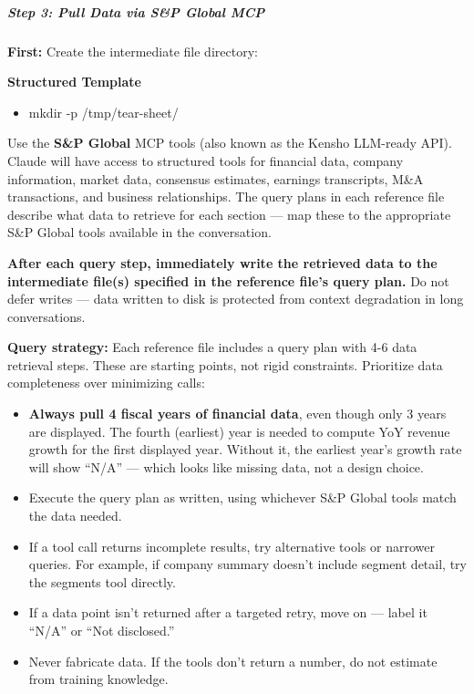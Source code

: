 \documentclass[11pt]{article}
\begin{document}
\subparagraph{Step 3: Pull Data via S\&P Global MCP}\mbox{}\par

\textbf{First:} Create the intermediate file directory:

\textbf{Structured Template}
\begin{itemize}[leftmargin=*,itemsep=2pt,topsep=2pt]
\item {} mkdir -p /tmp/tear-sheet/
\end{itemize}

Use the \textbf{S\&P Global} MCP tools (also known as the Kensho LLM-ready API). Claude will have access to structured tools for financial data, company information, market data, consensus estimates, earnings transcripts, M\&A transactions, and business relationships. The query plans in each reference file describe what data to retrieve for each section — map these to the appropriate S\&P Global tools available in the conversation.


\textbf{After each query step, immediately write the retrieved data to the intermediate file(s) specified in the reference file's query plan.} Do not defer writes — data written to disk is protected from context degradation in long conversations.


\textbf{Query strategy:} Each reference file includes a query plan with 4-6 data retrieval steps. These are starting points, not rigid constraints. Prioritize data completeness over minimizing calls:


\begin{itemize}[leftmargin=*,itemsep=2pt,topsep=2pt]
\item {} \textbf{Always pull 4 fiscal years of financial data}, even though only 3 years are displayed. The fourth (earliest) year is needed to compute YoY revenue growth for the first displayed year. Without it, the earliest year's growth rate will show ``N/A'' — which looks like missing data, not a design choice.
\item {} Execute the query plan as written, using whichever S\&P Global tools match the data needed.
\item {} If a tool call returns incomplete results, try alternative tools or narrower queries. For example, if company summary doesn't include segment detail, try the segments tool directly.
\item {} If a data point isn't returned after a targeted retry, move on — label it ``N/A'' or ``Not disclosed.''
\item {} Never fabricate data. If the tools don't return a number, do not estimate from training knowledge.
\end{itemize}
\end{document}
